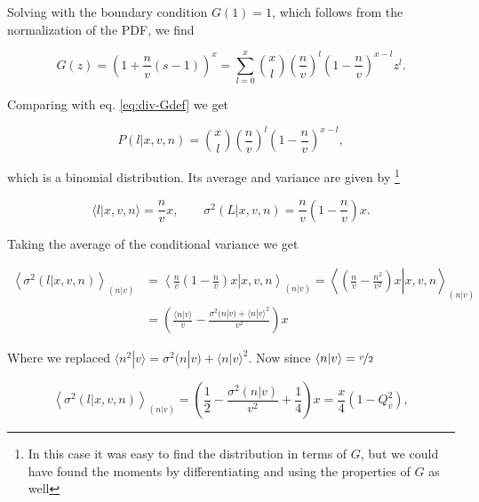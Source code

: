 Solving with the boundary condition $G(1) = 1$, which follows from the normalization of the PDF, we find


\begin{equation}
  G(z) = \left(1+\frac{n}{v}\left(s-1\right)\right)^x = \sum_{l=0}^x {x\choose l}\left(\frac{n}{v}\right)^l\left(1-\frac{n}{v}\right)^{x-l}z^l.
\end{equation}

Comparing with eq. \eqref{eq:div-Gdef} we get

\begin{equation*}
  P(l|x,v,n) = {x\choose l}\left(\frac{n}{v}\right)^l\left(1-\frac{n}{v}\right)^{x-l},
\end{equation*}

which is a binomial distribution. Its average and variance are given by \footnote{ In this case it was easy to find the distribution in terms of $G$, but we could have found the moments by differentiating and using the properties of $G$ as well}


\begin{equation*}
  \langle l|x,v,n\rangle = \frac{n}{v}x, \quad\quad \sigma^2(L|x,v,n) = \frac{n}{v}\left(1-\frac{n}{v}\right)x.
\end{equation*}

Taking the average of the conditional variance we get

\begin{equation*}
  \begin{split}
    \left\langle\sigma^2(l|x,v,n)\right\rangle_{(n|v)} &= \left\langle\left.\frac{n}{v}\left(1-\frac{n}{v}\right)x\right|x,v,n\right\rangle_{(n|v)} = \left\langle\left.\left(\frac{n}{v}-\frac{n^2}{v^2}\right)x\right|x,v,n\right\rangle_{(n|v)}\\
    &= \left(\frac{\langle n|v\rangle}{v}-\frac{\sigma^2(n|v) + \langle n|v\rangle^2}{v^2}\right)x
  \end{split}
\end{equation*}

Where we replaced $\langle n^2|v\rangle = \sigma^2(n|v) + \langle n|v\rangle^2$. Now since $\langle n|v\rangle = \nicefrac{v}{2}$

\begin{equation}
  \label{eq:div-varofavel}
  \left\langle\sigma^2(l|x,v,n)\right\rangle_{(n|v)} = \left(\frac{1}{2} - \frac{\sigma^2(n|v)}{v^2} + \frac{1}{4}\right)x = \frac{x}{4}\left(1-Q_v^2\right),
\end{equation}


